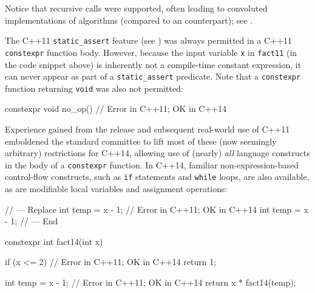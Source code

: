 \noindent Notice that recursive calls were supported, often leading to convoluted
implementations of algorithms (compared to an 
counterpart); see .

The C++11 \lstinline!static_assert! feature (see ) was always
permitted in a C++11 \lstinline!constexpr! function body.
However, because the input variable \lstinline!x! in \lstinline!fact11!
(in the code snippet above) is inherently not a compile-time constant expression, it can
never appear as part of a \lstinline!static_assert! predicate. Note that a
\lstinline!constexpr! function returning \lstinline!void! was also not permitted:

\begin{emcppslisting}[emcppsstandards={c++14}]
constexpr void no_op() { }  // Error in C++11; OK in C++14
\end{emcppslisting}

\noindent Experience gained from the release and subsequent real-world use of
C++11 emboldened the standard committee to lift most of these (now
seemingly arbitrary) restrictions for C++14, allowing use of (nearly)
\emph{all} language constructs in the body of a \lstinline!constexpr!
function. In C++14, familiar non-expression-based control-flow
constructs, such as \lstinline!if! statements and \lstinline!while! loops, are
also available, as are modifiable local variables and assignment
operations:

\begin{emcppshiddenlisting}[emcppsbatch=e1]
// --- Replace
    int temp = x - 1;  // Error in C++11; OK in C++14
    int temp = x - 1;
// --- End
\end{emcppshiddenlisting}
\begin{emcppslisting}[emcppsstandards={c++14},emcppsbatch=e1]
constexpr int fact14(int x)
{
    if (x <= 2)        // Error in C++11; OK in C++14
    {
        return 1;
    }

    int temp = x - 1;  // Error in C++11; OK in C++14
    return x * fact14(temp);
}
\end{emcppslisting}

